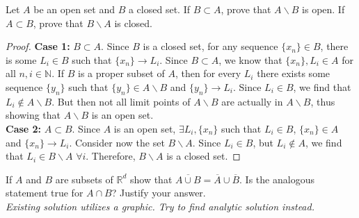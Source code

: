 \documentclass[12pt]{book}
\newcommand{\N}{\mathbb{N}}
\newcommand{\R}{\mathbb{R}}
\newenvironment{exercise}[2][Exercise]{\begin{trivlist}
\item[\hskip \labelsep {\bfseries #1}\hskip \labelsep {\bfseries #2.}]}{\end{trivlist}}
\begin{document}
\begin{exercise}{7.3.6}
Let $A$ be an open set and $B$ a closed set. If $B \subset A$, prove that $A \backslash B$ is
open. If $A \subset B$, prove that $B \backslash A$ is closed.

\begin{proof}
    \textbf{Case 1:} $B\subset A$. Since $B$ is a closed set, for any sequence $\{x_n\} \in B$, there is some $L_i \in B$ such that $\{x_n\} \to L_i$. Since $B \subset A$, we know that $\{x_n\}, L_i \in A$ for all $n,i \in \N$. If $B$ is a proper subset of $A$, then for every $L_i$ there exists some sequence $\{y_n\}$ such that $\{y_n\} \in A\backslash B$ and $\{y_n\} \to L_i$. Since $L_i \in B$, we find that $L_i \notin A\backslash B$. But then not all limit points of $A \backslash B$ are actually in $A \backslash B$, thus showing that $A \backslash B$ is an open set. \\
    \textbf{Case 2:} $A \subset B$. Since $A$ is an open set, $\exists L_i, \{x_n\}$ such that $L_i \in B$, $\{x_n\} \in A$ and $\{x_n\} \to L_i$. Consider now the set $B \backslash A$. Since $L_i \in B$, but $L_i \notin A$, we find that $L_i \in B \backslash A  \, \, \forall i$. Therefore, $B \backslash A$ is a closed set.
\end{proof}
\end{exercise}


\begin{exercise}{7.3.9}
If $A$ and $B$ are subsets of $\R^d$ show that $\overline{A \cup B} = \overline{A} \cup \overline{B}$. Is the analogous statement true for $A \cap B$? Justify your answer. \\


\emph{Existing solution utilizes a graphic. Try to find analytic solution instead.}
\end{exercise}
\end{document}
